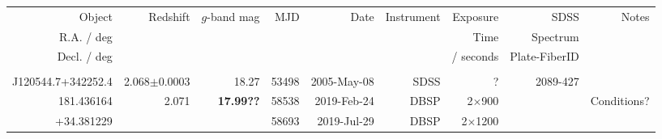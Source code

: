 \documentclass[a4paper,fleqn,usenatbib]{mnras}
\begin{document}
\begin{table*}
  \centering
  \begin{tabular}{r  r  r r r   r r r r}
  \hline 
  \hline 
    Object                         & \multirow{3}{*}{Redshift} & \multirow{3}{*}{$g$-band mag}      & \multirow{3}{*}{MJD} & \multirow{3}{*}{Date}  & \multirow{3}{*}{Instrument}  & Exposure      & SDSS                        & \multirow{3}{*}{Notes} \\
    R.A. / deg                   &                                         &                                                          &                                 &                                   &                                               &  Time           & Spectrum                 & \\
    Decl. / deg                 &                                         &                                                          &                                &                                     &                                              &  / seconds    & Plate-FiberID  & \\
  \hline 
                                     &                                          &                        &             &                            &                    &                             &                              & \\
 J120544.7+342252.4  & 2.068$\pm$0.0003          &   18.27             & 53498  &  2005-May-08   & SDSS             & ?                          & 2089-427             & \\
        181.436164          & 2.071                               & {\bf 17.99??}   & 58538  &  2019-Feb-24    & DBSP            &  2$\times$900    &                               &  Conditions? \\
       +34.381229           &                                        &                          & 58693  &  2019-Jul-29     & DBSP            &  2$\times$1200   &                              &   \\

\end{tabular}
\end{table*}
\end{document}
